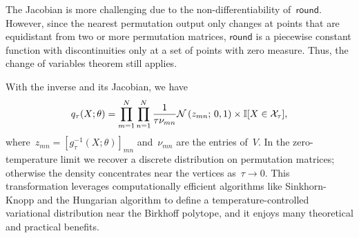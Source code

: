 \documentclass[twoside]{article}
\begin{document}

The Jacobian is more challenging due to the non-differentiability
of~$\mathsf{round}$. However, since the nearest permutation output
only changes at points that are equidistant from two or more
permutation matrices, $\mathsf{round}$ is a piecewise constant
function with discontinuities only at a set of points with
zero measure. Thus, the change of variables theorem still applies.

With the inverse and its Jacobian, we have
\begin{align*}
  q_\tau(X; \theta) = 
  \prod_{m=1}^N\prod_{n=1}^N  \frac{1}{\tau \nu_{mn}}
  \mathcal{N} \left( z_{mn}; \, 0, 1 \right)
  \times \mathbb{I}[X \in \mathcal{X}_\tau],
\end{align*}
where~${z_{mn} = [g_\tau^{-1}(X; \theta)]_{mn}}$ and~$\nu_{mn}$
are the entries of~$V$.
In the zero-temperature limit we recover a discrete
distribution on permutation matrices; otherwise the density
concentrates near the vertices as~${\tau \to 0}$.  This
transformation leverages computationally efficient algorithms
like Sinkhorn-Knopp and the Hungarian algorithm to define a
temperature-controlled variational distribution near the
Birkhoff polytope, and it enjoys many theoretical and practical
benefits.
\end{document}
